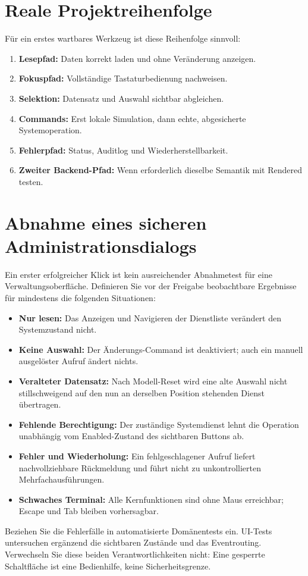 \section{Reale Projektreihenfolge}
Für ein erstes wartbares Werkzeug ist
diese Reihenfolge sinnvoll:
\begin{enumerate}
\item \textbf{Lesepfad:} Daten korrekt
laden und ohne Veränderung anzeigen.
\item \textbf{Fokuspfad:} Vollständige
Tastaturbedienung nachweisen.
\item \textbf{Selektion:} Datensatz
und Auswahl sichtbar abgleichen.
\item \textbf{Commands:} Erst lokale
Simulation, dann echte, abgesicherte
Systemoperation.
\item \textbf{Fehlerpfad:} Status,
Auditlog und Wiederherstellbarkeit.
\item \textbf{Zweiter Backend-Pfad:}
Wenn erforderlich dieselbe Semantik
mit Rendered testen.
\end{enumerate}

\section{Abnahme eines sicheren Administrationsdialogs}
Ein erster erfolgreicher Klick ist kein ausreichender
Abnahmetest für eine Verwaltungsoberfläche. Definieren
Sie vor der Freigabe beobachtbare Ergebnisse für
mindestens die folgenden Situationen:

\begin{itemize}
\item \textbf{Nur lesen:} Das Anzeigen und Navigieren der
Dienstliste verändert den Systemzustand nicht.
\item \textbf{Keine Auswahl:} Der Änderungs-Command ist
deaktiviert; auch ein manuell ausgelöster Aufruf ändert nichts.
\item \textbf{Veralteter Datensatz:} Nach Modell-Reset wird
eine alte Auswahl nicht stillschweigend auf den nun an
derselben Position stehenden Dienst übertragen.
\item \textbf{Fehlende Berechtigung:} Der zuständige
Systemdienst lehnt die Operation unabhängig vom
Enabled-Zustand des sichtbaren Buttons ab.
\item \textbf{Fehler und Wiederholung:} Ein fehlgeschlagener
Aufruf liefert nachvollziehbare Rückmeldung und führt
nicht zu unkontrollierten Mehrfachausführungen.
\item \textbf{Schwaches Terminal:} Alle Kernfunktionen sind
ohne Maus erreichbar; Escape und Tab bleiben vorhersagbar.
\end{itemize}

Beziehen Sie die Fehlerfälle in automatisierte Domänentests
ein. UI-Tests untersuchen ergänzend die sichtbaren Zustände
und das Eventrouting. Verwechseln Sie diese beiden
Verantwortlichkeiten nicht: Eine gesperrte Schaltfläche
ist eine Bedienhilfe, keine Sicherheitsgrenze.

